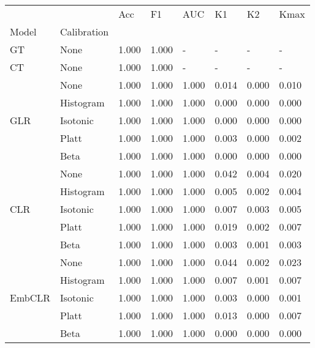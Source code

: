 \begin{tabular}{llllllll}
\toprule
 &  & Acc & F1 & AUC & K1 & K2 & Kmax \\
Model & Calibration &  &  &  &  &  &  \\
\midrule
GT & None & 1.000 & 1.000 & - & - & - & - \\
\cline{1-8}
CT & None & 1.000 & 1.000 & - & - & - & - \\
\cline{1-8}
\multirow[t]{5}{*}{GLR} & None & 1.000 & 1.000 & 1.000 & 0.014 & 0.000 & 0.010 \\
 & Histogram & 1.000 & 1.000 & 1.000 & 0.000 & 0.000 & 0.000 \\
 & Isotonic & 1.000 & 1.000 & 1.000 & 0.000 & 0.000 & 0.000 \\
 & Platt & 1.000 & 1.000 & 1.000 & 0.003 & 0.000 & 0.002 \\
 & Beta & 1.000 & 1.000 & 1.000 & 0.000 & 0.000 & 0.000 \\
\cline{1-8}
\multirow[t]{5}{*}{CLR} & None & 1.000 & 1.000 & 1.000 & 0.042 & 0.004 & 0.020 \\
 & Histogram & 1.000 & 1.000 & 1.000 & 0.005 & 0.002 & 0.004 \\
 & Isotonic & 1.000 & 1.000 & 1.000 & 0.007 & 0.003 & 0.005 \\
 & Platt & 1.000 & 1.000 & 1.000 & 0.019 & 0.002 & 0.007 \\
 & Beta & 1.000 & 1.000 & 1.000 & 0.003 & 0.001 & 0.003 \\
\cline{1-8}
\multirow[t]{5}{*}{EmbCLR} & None & 1.000 & 1.000 & 1.000 & 0.044 & 0.002 & 0.023 \\
 & Histogram & 1.000 & 1.000 & 1.000 & 0.007 & 0.001 & 0.007 \\
 & Isotonic & 1.000 & 1.000 & 1.000 & 0.003 & 0.000 & 0.001 \\
 & Platt & 1.000 & 1.000 & 1.000 & 0.013 & 0.000 & 0.007 \\
 & Beta & 1.000 & 1.000 & 1.000 & 0.000 & 0.000 & 0.000 \\
\cline{1-8}
\bottomrule
\end{tabular}
